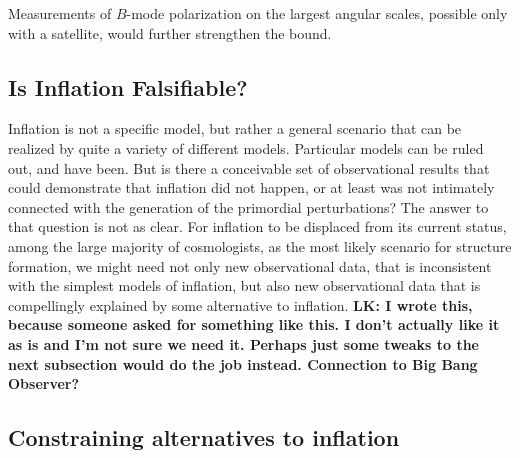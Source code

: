 Measurements of $B$-mode polarization on the largest angular scales, possible only with a satellite, would further strengthen the bound. 

\subsection{Is Inflation Falsifiable?}

Inflation is not a specific model, but rather a general scenario that can be realized by quite a variety of different models. Particular models can be ruled out, and have been. But is there a conceivable set of observational results that could demonstrate
that inflation did not happen, or at least was not intimately connected with the generation of the primordial perturbations? 
The answer to that question is not as clear. For inflation to be displaced from its current status, among the large majority of cosmologists, as the most likely scenario for structure formation, we might need not only new observational data, that is inconsistent with the simplest models of inflation, but also new observational data that is compellingly explained by some alternative to inflation. 
{\bf LK: I wrote this, because someone asked for something like this. I don't actually like it as is and I'm not sure we
need it. Perhaps just some tweaks to the next subsection would do the job instead. Connection to Big Bang Observer?}

\subsection{Constraining alternatives to inflation}

